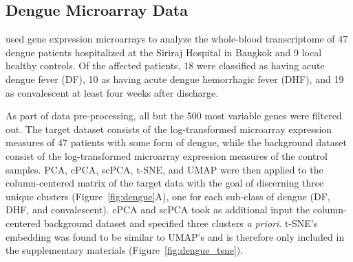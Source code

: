 \subsection{Dengue Microarray Data}\label{dengue_data}

\citet{Kwissa2014} used gene expression microarrays to analyze the whole-blood transcriptome of 47 dengue patients hospitalized at the Siriraj Hospital in Bangkok and 9 local healthy controls. Of the affected patients, 18 were classified as having acute dengue fever (DF), 10 as having acute dengue hemorrhagic fever (DHF), and 19 as convalescent at least four weeks after discharge.

As part of data pre-processing, all but the 500 most variable genes were filtered out. The target dataset consists of the log-transformed microarray expression measures of 47 patients with some form of dengue, while the background dataset consist of the log-transformed microarray expression measures of the control samples. PCA, cPCA, scPCA, t-SNE, and UMAP were then applied to the column-centered matrix of the target data with the goal of discerning three unique clusters (Figure~\ref{fig:dengue}A), one for each sub-class of dengue (DF, DHF, and convalescent). cPCA and scPCA took as additional input the column-centered background dataset and specified three clusters \textit{a priori}. t-SNE's embedding was found to be similar to UMAP's and is therefore only included in the supplementary materials (Figure~\ref{fig:dengue_tsne}).
\FloatBarrier
